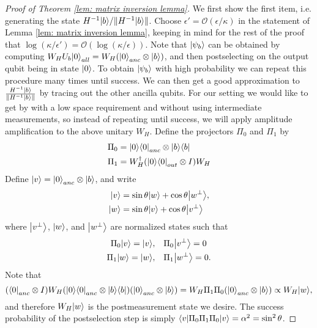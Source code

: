 \documentclass[11pt]{article}
\theoremstyle{definition}
\theoremstyle{remark}
\begin{document}
\begin{proof}[Proof of Theorem \ref{lem: matrix inversion lemma}]
We first show the first item, i.e. generating the state $H^{-1}{\left\vert{b}\right\rangle} / \|H^{-1}{\left\vert{b}\right\rangle}\|$. Choose $\epsilon' = \mathcal{O}(\epsilon/\kappa)$ in the statement of Lemma \ref{lem: matrix inversion lemma}, keeping in mind for the rest of the proof that $\log(\kappa/\epsilon') = \mathcal{O}(\log(\kappa/\epsilon))$. Note that ${\left\vert{\psi_b}\right\rangle}$ can be obtained by computing $W_HU_b{\left\vert{0}\right\rangle}_{all} = W_H ({\left\vert{0}\right\rangle}_{anc} \otimes {\left\vert{b}\right\rangle})$, and then postselecting on the output qubit being in state ${\left\vert{0}\right\rangle}$. To obtain ${\left\vert{\psi_b}\right\rangle}$ with high probability we can repeat this procedure many times until success. We can then get a good approximation to $\frac{H^{-1}{\left\vert{b}\right\rangle}} {\|H^{-1}{\left\vert{b}\right\rangle}\|} $ by tracing out the other ancilla qubits. For our setting we would like to get by with a low space requirement and without using intermediate measurements, so instead of repeating until success, we will apply amplitude amplification to the above unitary $W_H$. Define the projectors $\Pi_0$ and $\Pi_1$ by
\begin{align}
\Pi_0 &= {\left\vert{0}\right\rangle}{\left\langle{0}\right\vert}_{anc} \otimes {\left\vert{b}\right\rangle}{\left\langle{b}\right\vert} \\
\Pi_1 &= W_H^\dagger ({\left\vert{0}\right\rangle}{\left\langle{0}\right\vert}_{out} \otimes I) W_H
\end{align}
Define ${\left\vert{v}\right\rangle} = {\left\vert{0}\right\rangle}_{anc}\otimes {\left\vert{b}\right\rangle}$, and write
\begin{align}
{\left\vert{v}\right\rangle} &= \sin \theta {\left\vert{w}\right\rangle} +\cos \theta{\left\vert{w^\perp}\right\rangle}, \\ 
{\left\vert{w}\right\rangle} &= \sin \theta {\left\vert{v}\right\rangle} + \cos \theta{\left\vert{v^\perp}\right\rangle}
\end{align}
where ${\left\vert{v^\perp}\right\rangle}$, ${\left\vert{w}\right\rangle}$, and ${\left\vert{w^\perp}\right\rangle}$ are normalized states such that 
\begin{align}
\Pi_0{\left\vert{v}\right\rangle} = {\left\vert{v}\right\rangle},&\quad \Pi_0{\left\vert{v^\perp}\right\rangle} = 0 \\
\Pi_1{\left\vert{w}\right\rangle} = {\left\vert{w}\right\rangle},&\quad \Pi_1{\left\vert{w^\perp}\right\rangle} = 0.
\end{align}
Note that
\begin{equation} 
({\left\langle{0}\right\vert}_{anc} \otimes I) W_H ({\left\vert{0}\right\rangle}{\left\langle{0}\right\vert}_{anc} \otimes {\left\vert{b}\right\rangle}{\left\langle{b}\right\vert}) ({\left\vert{0}\right\rangle}_{anc} \otimes {\left\vert{b}\right\rangle}) = W_H \Pi_1\Pi_0({\left\vert{0}\right\rangle}_{anc} \otimes {\left\vert{b}\right\rangle}) \propto W_H {\left\vert{w}\right\rangle},
\end{equation}
and therefore $W_H{\left\vert{w}\right\rangle}$ is the postmeasurement state we desire. The success probability of the postselection step is simply ${\left\langle{v}\right\vert}\Pi_0\Pi_1\Pi_0{\left\vert{v}\right\rangle} = \alpha^2 = \sin^2\theta$. 


\end{proof}
\end{document}
